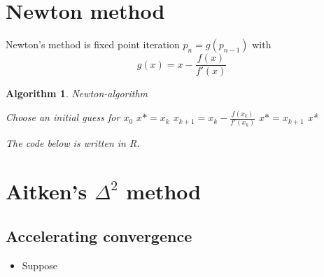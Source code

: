 \documentclass[12pt]{article}
\newtheorem{alg}[theorem]{Algorithm}
\begin{document}
\section{Newton method}
Newton's method is fixed point iteration $p_n = g(p_{n-1})$ with $$g(x) = x - \frac{f(x)}{f'(x)}$$
\begin{alg}{Newton-algorithm}
\begin{algorithmic}
Choose an initial guess for $x_0$
\State $x* = x_{k}$
\State $x_{k+1} = x_k - \frac{f(x_k)}{f'(x_k)}$
\State $x* = x_{k+1}$
\State \Return x*
\EndIf
\EndFor	
\end{algorithmic}
The code below is written in R.
	
\end{alg}

\section{Aitken's $\Delta^2$ method}
\subsection{Accelerating convergence}
\begin{itemize}
	\item Suppose
\end{itemize}
\end{document}
